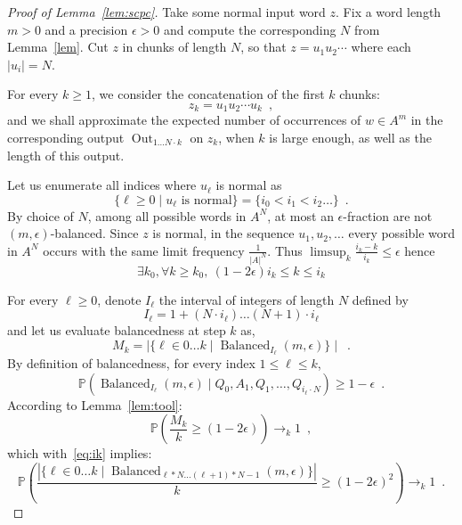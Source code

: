 \documentclass[11pt]{article}
\newcommand{\PP}{\mathbb{P}}
\DeclareMathOperator{\outp}{Out}
\DeclareMathOperator{\good}{Balanced}
\begin{document}
\begin{proof}[Proof of Lemma~\ref{lem:scpc}]
Take some normal input word $z$.
Fix a word length $m>0$ and a precision $\epsilon>0$ and compute the corresponding $N$ from Lemma~\ref{lem}.
Cut $z$ in chunks of length $N$, so that $z=u_1u_2\cdots$ where each $|u_i|=N$.

For every $k\geq 1$, we consider the concatenation  of the first $k$ chunks:
\[
z_k = u_1 u_2 \cdots u_k\enspace,
\]
and we shall approximate the expected number of occurrences of $w\in A^m$ in 
the corresponding output $\outp_{1\ldots N\cdot k}$ on $z_k$, when $k$ is large enough, as well as the length of this output.

Let us enumerate all indices where $u_\ell$ is normal as
\[
\{\ell \geq 0 \mid u_\ell \text{ is normal}\} = \{i_0 < i_1 < i_2 \ldots\}\enspace.
\]
By choice of $N$,
among all possible words in $A^N$, at most an $\epsilon$-fraction are not $(m,\epsilon)$-balanced.
Since $z$ is normal,  in the sequence $u_1,u_2,\ldots$ every possible word in $A^N$ occurs with the same limit frequency
$\frac{1}{|A|^N}$.
Thus $\limsup_k \frac{i_k - k}{i_k } \leq \epsilon$ hence 
\begin{equation}\label{eq:ik}
\exists k_0, \forall k \geq k_0,  ~ (1 -2\epsilon) i_k \leq k \leq i_k 
\end{equation}

For every $\ell\geq 0$, denote $I_\ell$ the interval of integers of length $N$ defined by 
\[
I_\ell=1+ (N\cdot i_\ell) \ldots (N+1)\cdot i_\ell
\]
and let us evaluate balancedness at step $k$ as,
\[
M_k = \mid \{ \ell \in 0\ldots k \mid  \good_{I_\ell}(m,\epsilon) \}\mid \enspace.
\]
By definition of balancedness,
for every index $1 \leq \ell \leq k$,
\[
\PP(\good_{I_\ell}(m,\epsilon)\mid Q_0,A_1,Q_1,\ldots, Q_{i_\ell\cdot N} ) \geq 1-\epsilon\enspace.
\]
According to Lemma~\ref{lem:tool}:
\[
\PP\left( \frac{M_k}{k} \geq (1-2\epsilon) \right) \to_k 1 \enspace,
\]
which with~\eqref{eq:ik} implies:
\[
\PP\left(
\frac{| \{ \ell \in 0\ldots k \mid  \good_{\ell * N\ldots (\ell+1) * N-1}(m,\epsilon) \}|}{k}
\geq (1-2\epsilon)^2 
\right)
\to_k 1
\enspace.
\]





\end{proof}
\end{document}
